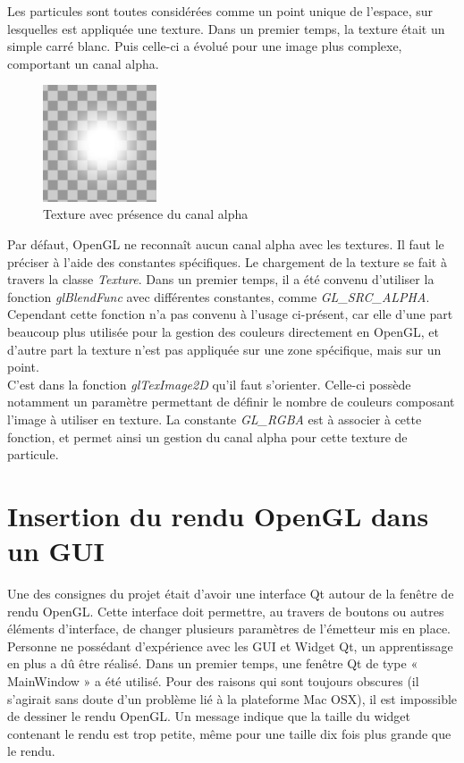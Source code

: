 Les particules sont toutes considérées comme un point unique de l'espace, sur
lesquelles est appliquée une texture. Dans un premier temps, la texture était un
simple carré blanc. Puis celle-ci a évolué pour une image plus complexe,
comportant un canal alpha.

\begin{figure}[h]
	\begin{center}
		\includegraphics[width=0.3\textwidth]{img/33-texture.png} 
	\end{center}
	\caption{Texture avec présence du canal alpha}
\end{figure}

Par défaut, OpenGL ne reconnaît aucun canal alpha avec les textures. Il faut le
préciser à l'aide des constantes spécifiques. Le chargement de la texture se
fait à travers la classe \emph{Texture}. Dans un premier temps, il a été convenu
d'utiliser la fonction \emph{glBlendFunc} avec différentes constantes, comme
\emph{GL\_SRC\_ALPHA}. Cependant cette fonction n'a pas convenu à l'usage ci-présent,
car elle d'une part beaucoup plus utilisée pour la gestion des couleurs
directement en OpenGL, et d'autre part la texture n'est pas appliquée sur une 
zone spécifique, mais sur un point.\\

C'est dans la fonction \emph{glTexImage2D} qu'il faut s'orienter. Celle-ci possède
notamment un paramètre permettant de définir le nombre de couleurs composant
l'image à utiliser en texture. La constante \emph{GL\_RGBA} est à associer à cette
fonction, et permet ainsi un gestion du canal alpha pour cette texture de
particule.

\section{Insertion du rendu OpenGL dans un GUI}

Une des consignes du projet était d'avoir une interface Qt autour de la fenêtre
de rendu OpenGL. Cette interface doit permettre, au travers de boutons ou autres
éléments d'interface, de changer plusieurs paramètres de l'émetteur mis en
place. Personne ne possédant d'expérience avec les GUI et Widget Qt, un
apprentissage en plus a dû être réalisé. Dans un premier temps, une fenêtre Qt 
de type « MainWindow » a été utilisé. Pour des raisons qui sont toujours
obscures (il s'agirait sans doute d'un problème lié à la plateforme Mac OSX), il
est impossible de dessiner le rendu OpenGL. Un message indique que la taille du
widget contenant le rendu est trop petite, même pour une taille dix fois plus
grande que le rendu.\\

